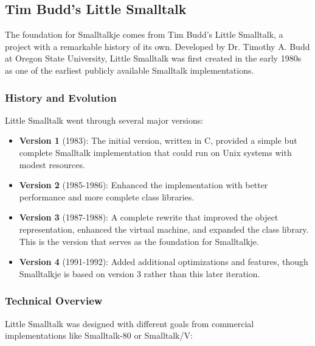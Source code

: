 \documentclass[12pt,a4paper]{report}
\begin{document}
\subsection{Tim Budd's Little Smalltalk}

The foundation for Smalltalkje comes from Tim Budd's Little Smalltalk, a project with a remarkable history of its own. Developed by Dr. Timothy A. Budd at Oregon State University, Little Smalltalk was first created in the early 1980s as one of the earliest publicly available Smalltalk implementations.

\subsubsection{History and Evolution}

Little Smalltalk went through several major versions:

\begin{itemize}
    \item \textbf{Version 1} (1983): The initial version, written in C, provided a simple but complete Smalltalk implementation that could run on Unix systems with modest resources.
    
    \item \textbf{Version 2} (1985-1986): Enhanced the implementation with better performance and more complete class libraries.
    
    \item \textbf{Version 3} (1987-1988): A complete rewrite that improved the object representation, enhanced the virtual machine, and expanded the class library. This is the version that serves as the foundation for Smalltalkje.
    
    \item \textbf{Version 4} (1991-1992): Added additional optimizations and features, though Smalltalkje is based on version 3 rather than this later iteration.
\end{itemize}

\subsubsection{Technical Overview}

Little Smalltalk was designed with different goals from commercial implementations like Smalltalk-80 or Smalltalk/V:
\end{document}

